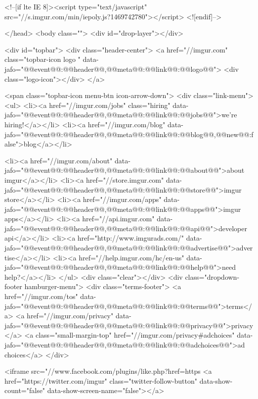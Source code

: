     <!--[if lte IE 8]><script type="text/javascript" src="//s.imgur.com/min/iepoly.js?1469742780"></script>
<![endif]-->
    
</head>
<body class="">
    <div id="drop-layer"></div>
                        

<div id="topbar">
    <div class="header-center">
        <a href="//imgur.com" class="topbar-icon logo " data-jafo="{@@event@@:@@header@@,@@meta@@:{@@link@@:@@logo@@}}">
            <div class="logo-icon"></div>
        </a>

        <span class="topbar-icon menu-btn icon-arrow-down">
            <div class="link-menu">
                <ul>
                    <li><a href="//imgur.com/jobs" class="hiring" data-jafo="{@@event@@:@@header@@,@@meta@@:{@@link@@:@@jobs@@}}">we're hiring!</a></li>
                                        <li><a href="//imgur.com/blog" data-jafo="{@@event@@:@@header@@,@@meta@@:{@@link@@:@@blog@@,@@new@@:false}}">blog</a></li>
                    
                    <li><a href="//imgur.com/about"  data-jafo="{@@event@@:@@header@@,@@meta@@:{@@link@@:@@about@@}}">about imgur</a></li>
                    <li><a href="//store.imgur.com" data-jafo="{@@event@@:@@header@@,@@meta@@:{@@link@@:@@store@@}}">imgur store</a></li>
                    <li><a href="//imgur.com/apps"  data-jafo="{@@event@@:@@header@@,@@meta@@:{@@link@@:@@apps@@}}">imgur apps</a></li>
                    <li><a href="//api.imgur.com" data-jafo="{@@event@@:@@header@@,@@meta@@:{@@link@@:@@api@@}}">developer api</a></li>
                    <li><a href="http://www.imgurads.com/" data-jafo="{@@event@@:@@header@@,@@meta@@:{@@link@@:@@advertise@@}}">advertise</a></li>
                    <li><a href="//help.imgur.com/hc/en-us" data-jafo="{@@event@@:@@header@@,@@meta@@:{@@link@@:@@help@@}}">need help?</a></li>
                </ul>
                <div class="clear"></div>
                <div class="dropdown-footer hamburger-menu">
                    <div class="terms-footer">
                        <a href="//imgur.com/tos"  data-jafo="{@@event@@:@@header@@,@@meta@@:{@@link@@:@@terms@@}}">terms</a>
                        <a href="//imgur.com/privacy"  data-jafo="{@@event@@:@@header@@,@@meta@@:{@@link@@:@@privacy@@}}">privacy</a>
                        <a class="small-margin-top" href="//imgur.com/privacy#adchoices" data-jafo="{@@event@@:@@header@@,@@meta@@:{@@link@@:@@adchoices@@}}">ad choices</a>
                    </div>
                     
                    <iframe src="//www.facebook.com/plugins/like.php?href=https%
                    <a href="https://twitter.com/imgur" class="twitter-follow-button" data-show-count="false" data-show-screen-name="false"></a>
                    
